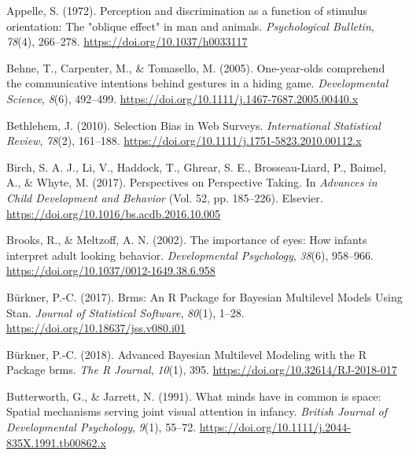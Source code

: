 \documentclass[
  man,mask,floatsintext]{apa6}
\newlength{\cslhangindent}
\newlength{\cslentryspacingunit} %
\newenvironment{CSLReferences}[2] %
 {%
  \setlength{\parindent}{0pt}
  \ifodd #1
  \let\oldpar\par
  \def\par{\hangindent=\cslhangindent\oldpar}
  \fi
  \setlength{\parskip}{#2\cslentryspacingunit}
 }%
 {}
\begin{document}
\hypertarget{refs}{}
\begin{CSLReferences}{1}{0}
\leavevmode{}%
Appelle, S. (1972). Perception and discrimination as a function of stimulus orientation: {The} "oblique effect" in man and animals. \emph{Psychological Bulletin}, \emph{78}(4), 266--278. \url{https://doi.org/10.1037/h0033117}

\leavevmode{}%
Behne, T., Carpenter, M., \& Tomasello, M. (2005). One-year-olds comprehend the communicative intentions behind gestures in a hiding game. \emph{Developmental Science}, \emph{8}(6), 492--499. \url{https://doi.org/10.1111/j.1467-7687.2005.00440.x}

\leavevmode{}%
Bethlehem, J. (2010). Selection {Bias} in {Web Surveys}. \emph{International Statistical Review}, \emph{78}(2), 161--188. \url{https://doi.org/10.1111/j.1751-5823.2010.00112.x}

\leavevmode{}%
Birch, S. A. J., Li, V., Haddock, T., Ghrear, S. E., Brosseau-Liard, P., Baimel, A., \& Whyte, M. (2017). Perspectives on {Perspective Taking}. In \emph{Advances in {Child Development} and {Behavior}} (Vol. 52, pp. 185--226). {Elsevier}. \url{https://doi.org/10.1016/bs.acdb.2016.10.005}

\leavevmode{}%
Brooks, R., \& Meltzoff, A. N. (2002). The importance of eyes: {How} infants interpret adult looking behavior. \emph{Developmental Psychology}, \emph{38}(6), 958--966. \url{https://doi.org/10.1037/0012-1649.38.6.958}

\leavevmode{}%
Bürkner, P.-C. (2017). Brms: {An R Package} for {Bayesian Multilevel Models Using Stan}. \emph{Journal of Statistical Software}, \emph{80}(1), 1--28. \url{https://doi.org/10.18637/jss.v080.i01}

\leavevmode{}%
Bürkner, P.-C. (2018). Advanced {Bayesian Multilevel Modeling} with the {R Package} brms. \emph{The R Journal}, \emph{10}(1), 395. \url{https://doi.org/10.32614/RJ-2018-017}

\leavevmode{}%
Butterworth, G., \& Jarrett, N. (1991). What minds have in common is space: {Spatial} mechanisms serving joint visual attention in infancy. \emph{British Journal of Developmental Psychology}, \emph{9}(1), 55--72. \url{https://doi.org/10.1111/j.2044-835X.1991.tb00862.x}


\end{CSLReferences}
\end{document}
